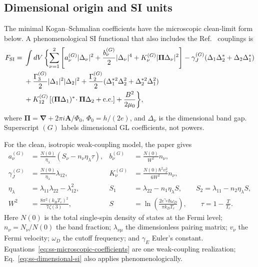 \documentclass[11pt]{article}
\begin{document}
\subsection{Dimensional origin and SI units}

The minimal Kogan--Schmalian coefficients have the microscopic clean-limit
form below.  A phenomenological SI functional that also includes the
Ref.~\cite{Lin2016} couplings is
\begin{align}
    F_{\rm SI}={}&\int dV\,\biggl\{
      \sum_{\nu=1}^{2}\left[
        a_\nu^{(G)}|\Delta_\nu|^2
        +\frac{b_\nu^{(G)}}{2}|\Delta_\nu|^4
        +K_\nu^{(G)}|\boldsymbol\Pi\Delta_\nu|^2
      \right]
      -\gamma_J^{(G)}(\Delta_1\Delta_2^*+\Delta_2\Delta_1^*)\\
      &+\frac{\Gamma_3^{(G)}}{2}|\Delta_1|^2|\Delta_2|^2
       +\frac{\Gamma_2^{(G)}}{2}
         (\Delta_1^{*2}\Delta_2^2+\Delta_2^{*2}\Delta_1^2)\\
      &+K_{12}^{(G)}\left[(\boldsymbol\Pi\Delta_1)^*\!\cdot
                              \boldsymbol\Pi\Delta_2+\mathrm{c.c.}\right]
      +\frac{B^2}{2\mu_0}
    \biggr\},
    \label{eq:ss-dimensional-si}
\end{align}
where $\boldsymbol\Pi=\boldsymbol\nabla+2\pi i\mathbf A/\Phi_0$,
$\Phi_0=h/(2e)$, and $\Delta_\nu$ is the dimensional band gap.  Superscript
$(G)$ labels dimensional GL coefficients, not powers.

For the clean, isotropic weak-coupling model, the paper gives
~\cite{Kogan2011}
\begin{align}
    a_\nu^{(G)}
      &=\frac{N(0)}{\eta_\lambda}
        \left(S_\nu-n_\nu\eta_\lambda\tau\right),&
    b_\nu^{(G)}&=\frac{N(0)}{W^2}n_\nu,\\
    \gamma_J^{(G)}&=\frac{N(0)}{\eta_\lambda}\lambda_{12},&
    K_\nu^{(G)}&=\frac{N(0)\hbar^2v_\nu^2}{6W^2}n_\nu,
    \label{eq:ss-microscopic-coefficients}\\
    \eta_\lambda&=\lambda_{11}\lambda_{22}-\lambda_{12}^2,&
    S_1&=\lambda_{22}-n_1\eta_\lambda S,\qquad
    S_2=\lambda_{11}-n_2\eta_\lambda S,\\
    W^2&=\frac{8\pi^2(k_BT_c)^2}{7\zeta(3)},&
    S&=\ln\!\left(\frac{2e^{\gamma_E}\hbar\omega_D}
                         {\pi k_BT_c}\right),\qquad
    \tau=1-\frac{T}{T_c}.
\end{align}
Here $N(0)$ is the total single-spin density of states at the Fermi level;
$n_\nu=N_\nu/N(0)$ the band fraction; $\lambda_{\nu\mu}$ the dimensionless
pairing matrix; $v_\nu$ the Fermi velocity; $\omega_D$ the cutoff frequency;
and $\gamma_E$ Euler's constant.  Equations~\eqref{eq:ss-microscopic-coefficients}
are one weak-coupling realization; Eq.~\eqref{eq:ss-dimensional-si} also
applies phenomenologically.
\end{document}
